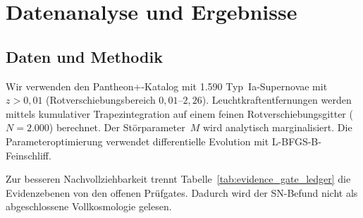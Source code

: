 \documentclass[aps,prd,twocolumn,superscriptaddress,nofootinbib,floatfix]{revtex4-2}
\begin{document}
\section{Datenanalyse und Ergebnisse}
\label{sec:analysis}

\subsection{Daten und Methodik}

Wir verwenden den Pantheon+-Katalog \cite{Scolnic2022} mit 1.590 Typ~Ia-Supernovae mit $z > 0{,}01$ (Rotverschiebungsbereich $0{,}01$--$2{,}26$). Leuchtkraftentfernungen werden mittels kumulativer Trapezintegration auf einem feinen Rotverschiebungsgitter ($N = 2.000$) berechnet. Der Störparameter~$M$ wird analytisch marginalisiert. Die Parameteroptimierung verwendet differentielle Evolution mit L-BFGS-B-Feinschliff.

Zur besseren Nachvollziehbarkeit trennt Tabelle~\ref{tab:evidence_gate_ledger} die Evidenzebenen von den offenen Prüfgates. Dadurch wird der SN-Befund nicht als abgeschlossene Vollkosmologie gelesen.
\end{document}
